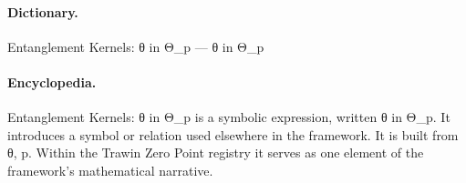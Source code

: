 \paragraph{Dictionary.}
Entanglement Kernels: θ in Θ\_p — θ in Θ\_p

\paragraph{Encyclopedia.}
Entanglement Kernels: θ in Θ\_p is a symbolic expression, written θ in Θ\_p. It introduces a symbol or relation used elsewhere in the framework. It is built from θ, p. Within the Trawin Zero Point registry it serves as one element of the framework's mathematical narrative.
